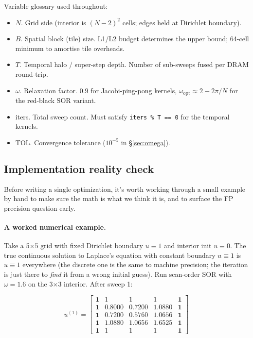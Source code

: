 \documentclass[11pt]{article}
\begin{document}
Variable glossary used throughout:
\begin{itemize}[leftmargin=1.4em,itemsep=1pt,topsep=1pt]
  \item $N$. Grid side (interior is $(N{-}2)^2$ cells; edges held at
        Dirichlet boundary).
  \item $B$. Spatial block (tile) size.  L1/L2 budget determines the
        upper bound; 64-cell minimum to amortise tile overheads.
  \item $T$. Temporal halo / super-step depth.  Number of sub-sweeps
        fused per DRAM round-trip.
  \item $\omega$. Relaxation factor.  $0.9$ for Jacobi-ping-pong
        kernels, $\omega_{\text{opt}}{\approx}2{-}2\pi/N$ for the
        red-black SOR variant.
  \item iters. Total sweep count.  Must satisfy
        \texttt{iters \% T == 0} for the temporal kernels.
  \item TOL. Convergence tolerance ($10^{-5}$ in §\ref{sec:omega}).
\end{itemize}

\subsection{Implementation reality check}
\label{sec:reality-check}

Before writing a single optimization, it's worth working through a
small example by hand to make sure the math is what we think it is,
and to surface the FP precision question early.

\paragraph{A worked numerical example.}  Take a 5$\times$5 grid with
fixed Dirichlet boundary $u{\equiv}1$ and interior init $u{\equiv}0$.
The true continuous solution to Laplace's equation with constant
boundary $u{\equiv}1$ is $u{\equiv}1$ everywhere (the discrete one is
the same to machine precision; the iteration is just there to
\emph{find} it from a wrong initial guess).  Run scan-order SOR with
$\omega{=}1.6$ on the 3$\times$3 interior.  After sweep 1:

\[
u^{(1)} = \begin{bmatrix}
\textbf{1}    & 1      & 1      & 1      & \textbf{1} \\
\textbf{1}    & 0.8000 & 0.7200 & 1.0880 & \textbf{1} \\
\textbf{1}    & 0.7200 & 0.5760 & 1.0656 & \textbf{1} \\
\textbf{1}    & 1.0880 & 1.0656 & 1.6525 & \textbf{1} \\
\textbf{1}    & 1      & 1      & 1      & \textbf{1}
\end{bmatrix}
\]
\end{document}
